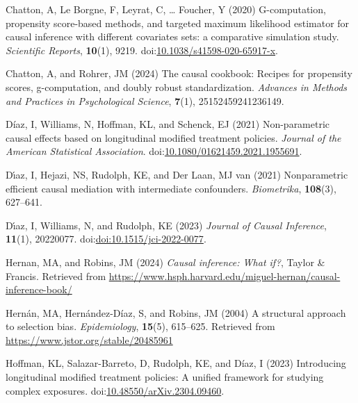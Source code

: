 \documentclass[
  single column]{article}
\newlength{\cslhangindent}
\newenvironment{CSLReferences}[2] %
 {\begin{list}{}{%
  \setlength{\itemindent}{0pt}
  \setlength{\leftmargin}{0pt}
  \setlength{\parsep}{0pt}
  \ifodd #1
   \setlength{\leftmargin}{\cslhangindent}
   \setlength{\itemindent}{-1\cslhangindent}
  \fi
  \setlength{\itemsep}{#2\baselineskip}}}
 {\end{list}}
\begin{document}
\label{refs}
\begin{CSLReferences}{1}{0}
Chatton, A, Le Borgne, F, Leyrat, C, \ldots{} Foucher, Y (2020)
G-computation, propensity score-based methods, and targeted maximum
likelihood estimator for causal inference with different covariates
sets: a comparative simulation study. \emph{Scientific Reports},
\textbf{10}(1), 9219.
doi:\href{https://doi.org/10.1038/s41598-020-65917-x}{10.1038/s41598-020-65917-x}.

Chatton, A, and Rohrer, JM (2024) The causal cookbook: Recipes for
propensity scores, g-computation, and doubly robust standardization.
\emph{Advances in Methods and Practices in Psychological Science},
\textbf{7}(1), 25152459241236149.

Díaz, I, Williams, N, Hoffman, KL, and Schenck, EJ (2021) Non-parametric
causal effects based on longitudinal modified treatment policies.
\emph{Journal of the American Statistical Association}.
doi:\href{https://doi.org/10.1080/01621459.2021.1955691}{10.1080/01621459.2021.1955691}.

Dı́az, I, Hejazi, NS, Rudolph, KE, and Der Laan, MJ van (2021)
Nonparametric efficient causal mediation with intermediate confounders.
\emph{Biometrika}, \textbf{108}(3), 627--641.

Dı́az, I, Williams, N, and Rudolph, KE (2023) \emph{Journal of Causal
Inference}, \textbf{11}(1), 20220077.
doi:\href{https://doi.org/doi:10.1515/jci-2022-0077}{doi:10.1515/jci-2022-0077}.

Hernan, MA, and Robins, JM (2024) \emph{Causal inference: What if?},
Taylor \& Francis. Retrieved from
\url{https://www.hsph.harvard.edu/miguel-hernan/causal-inference-book/}

Hernán, MA, Hernández-Díaz, S, and Robins, JM (2004) A structural
approach to selection bias. \emph{Epidemiology}, \textbf{15}(5),
615--625. Retrieved from \url{https://www.jstor.org/stable/20485961}

Hoffman, KL, Salazar-Barreto, D, Rudolph, KE, and Díaz, I (2023)
Introducing longitudinal modified treatment policies: A unified
framework for studying complex exposures.
doi:\href{https://doi.org/10.48550/arXiv.2304.09460}{10.48550/arXiv.2304.09460}.


\end{CSLReferences}
\end{document}

